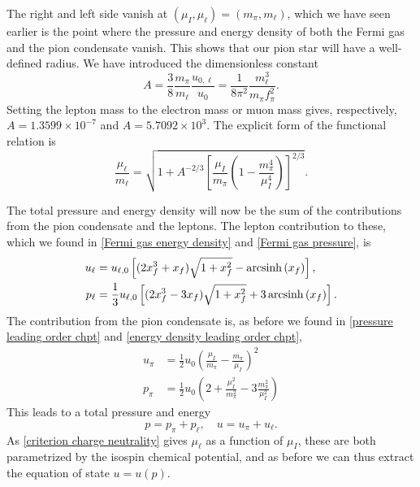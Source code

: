 %
The right and left side vanish at $(\mu_I, \mu_\ell) = (m_\pi, m_\ell)$, which we have seen earlier is the point where the pressure and energy density of both the Fermi gas and the pion condensate vanish.
This shows that our pion star will have a well-defined radius.
We have introduced the dimensionless constant
%
\begin{equation}
    A = \frac{3}{8} \frac{m_\pi} {m_\ell} \frac{u_{0, \ell}}{u_0}
    = \frac{1}{8 \pi^2} \frac{m_\ell^3}{m_\pi f_\pi^2}.
\end{equation}
%
Setting the lepton mass to the electron mass or muon mass gives, respectively, $A = 1.3599 \times10^{- 7}$ and $A = 5.7092 \times 10^{3}$.
The explicit form of the functional relation is
%
\begin{equation}
    \label{mu ell from mu I}
    \frac{\mu_\ell}{m_\ell}
    =
    \sqrt{
        1 + A^{-2/3}
        \left[
            \frac{\mu_I}{m_\pi}\left( 1 - \frac{m_\pi^4}{\mu_I^4}  \right)
        \right]^{2/3}
    }.
\end{equation}
%

The total pressure and energy density will now be the sum of the contributions from the pion condensate and the leptons.
The lepton contribution to these, which we found in \autoref{Fermi gas energy density} and \autoref{Fermi gas pressure}, is
%
\begin{align}
    u_\ell 
    &= u_{\ell,0} 
    \left[(2x_f^3 + x_f) \sqrt{1 + x_f^2} - \operatorname{arcsinh}\left(x_f\right)\right], \\
    p_\ell
    &=\frac{1}{3} u_{\ell,0}
    \left[(2x_f^3 - 3x_f) \sqrt{1 + x_f^2} + 3\operatorname{arcsinh}\left(x_f\right)\right].
\end{align}
%
The contribution from the pion condensate is, as before we found in \autoref{pressure leading order chpt} and \autoref{energy density leading order chpt},
%
\begin{align}
    u_\pi &= \frac{1}{2} u_0 \left( \frac{\mu_I}{m_\pi} - \frac{m_\pi}{\mu_I}\right)^2 \\
    p_\pi &= \frac{1}{2} u_0 \left( 2 + \frac{\mu_I^2}{m_\pi^2} - 3 \frac{m_\pi^2}{\mu_I^2}  \right)
\end{align}
%
This leads to a total pressure and energy
%
\begin{equation}
    p = p_\pi + p_\ell, \quad u = u_\pi + u_\ell.
\end{equation}
%
As \autoref{criterion charge neutrality} gives $\mu_\ell$ as a function of $\mu_I$, these are both parametrized by the isospin chemical potential, and as before we can thus extract the equation of state $u = u(p)$.


